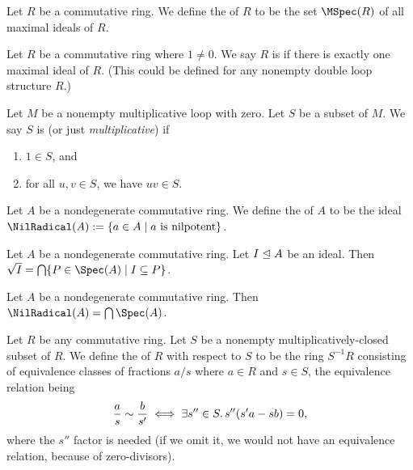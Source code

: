 \begin{definition}
Let $R$ be a commutative ring.
We define the  of $R$ to be the set $\MSpec(R)$ of all
maximal ideals of $R$.
\end{definition}

\begin{definition}
Let $R$ be a commutative ring where $1\neq0$.
We say $R$ is  if there is exactly one maximal ideal of $R$.
(This could be defined for any nonempty double loop structure $R$.)
\end{definition}

\begin{definition}
Let $M$ be a nonempty multiplicative loop with zero.
Let $S$ be a subset of $M$.
We say $S$ is  (or just \emph{multiplicative})
if
\begin{enumerate}
\item $1\in S$, and
\item for all $u,v\in S$, we have $uv\in S$.
\end{enumerate}
\end{definition}

\begin{definition}
Let $A$ be a nondegenerate commutative ring.
We define the  of $A$ to be the ideal
$\NilRadical(A):=\{a\in A\mid a\mbox{ is nilpotent}\}$. 
\end{definition}

\begin{theorem}
Let $A$ be a nondegenerate commutative ring.
Let $I\mathrel{\trianglelefteq} A$ be an ideal.
Then $\Radical{I}=\Intersects\{P\in\Spec(A)\mid I\subset P\}$.
\end{theorem}

\begin{theorem}
Let $A$ be a nondegenerate commutative ring.
Then $\NilRadical(A)=\Intersects\Spec(A)$.
\end{theorem}

\begin{definition}
Let $R$ be any commutative ring.
Let $S$ be a nonempty multiplicatively-closed subset of $R$.
We define the  of $R$ with respect to $S$ to be
the ring $S^{-1}R$ consisting of equivalence classes of fractions
$a/s$ where $a\in R$ and $s\in S$, the equivalence relation being
\begin{equation}
\frac{a}{s}\sim\frac{b}{s'}\iff\exists s''\in S\ldotp s''(s'a-sb)=0,
\end{equation}
where the $s''$ factor is needed (if we omit it, we would not have an
equivalence relation, because of zero-divisors).
\end{definition}